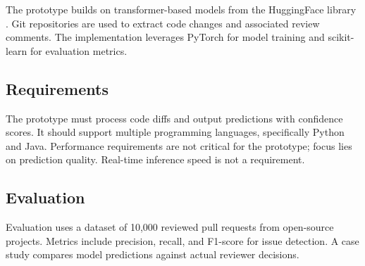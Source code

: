 \documentclass[usebib]{compactarticle}
\begin{document}
The prototype builds on transformer-based models from the HuggingFace library \cite{Author24Generic}.
Git repositories are used to extract code changes and associated review comments.
The implementation leverages PyTorch for model training and scikit-learn for evaluation metrics.

\subsection{Requirements}

The prototype must process code diffs and output predictions with confidence scores.
It should support multiple programming languages, specifically Python and Java.
Performance requirements are not critical for the prototype; focus lies on prediction quality.
Real-time inference speed is not a requirement.

\subsection{Evaluation}

Evaluation uses a dataset of 10,000 reviewed pull requests from open-source projects.
Metrics include precision, recall, and F1-score for issue detection.
A case study compares model predictions against actual reviewer decisions.
\end{document}
